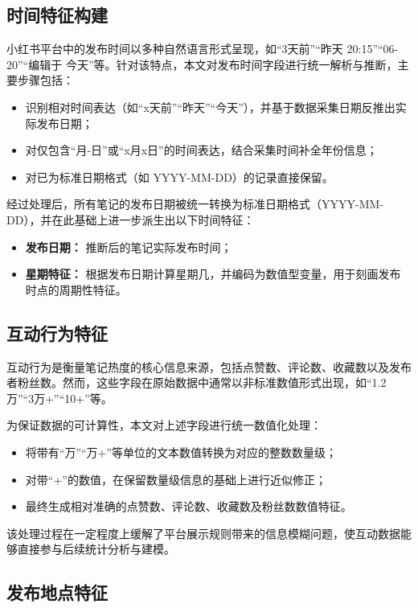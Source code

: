 \subsection{时间特征构建}

小红书平台中的发布时间以多种自然语言形式呈现，如“3天前”“昨天 20:15”“06-20”“编辑于 今天”等。针对该特点，本文对发布时间字段进行统一解析与推断，主要步骤包括：

\begin{itemize}
\item 识别相对时间表达（如“x天前”“昨天”“今天”），并基于数据采集日期反推出实际发布日期；
\item 对仅包含“月-日”或“x月x日”的时间表达，结合采集时间补全年份信息；
\item 对已为标准日期格式（如 YYYY-MM-DD）的记录直接保留。
\end{itemize}

经过处理后，所有笔记的发布日期被统一转换为标准日期格式（YYYY-MM-DD），并在此基础上进一步派生出以下时间特征：

\begin{itemize}
\item \textbf{发布日期：} 推断后的笔记实际发布时间；
\item \textbf{星期特征：} 根据发布日期计算星期几，并编码为数值型变量，用于刻画发布时点的周期性特征。
\end{itemize}

\subsection{互动行为特征}

互动行为是衡量笔记热度的核心信息来源，包括点赞数、评论数、收藏数以及发布者粉丝数。然而，这些字段在原始数据中通常以非标准数值形式出现，如“1.2万”“3万+”“10+”等。

为保证数据的可计算性，本文对上述字段进行统一数值化处理：

\begin{itemize}
\item 将带有“万”“万+”等单位的文本数值转换为对应的整数数量级；
\item 对带“+”的数值，在保留数量级信息的基础上进行近似修正；
\item 最终生成相对准确的点赞数、评论数、收藏数及粉丝数数值特征。
\end{itemize}

该处理过程在一定程度上缓解了平台展示规则带来的信息模糊问题，使互动数据能够直接参与后续统计分析与建模。

\subsection{发布地点特征}

